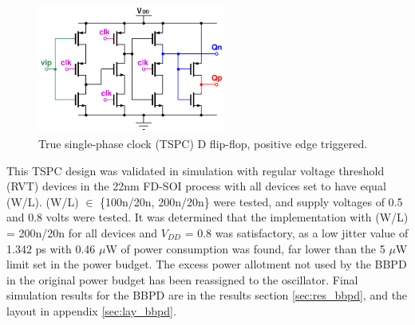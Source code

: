 			\begin{figure}[htb!]
			        \centering
			        \includegraphics[width=0.55\textwidth, angle=0]{./figs/design/tspc_}
			    \caption{True single-phase clock (TSPC) D flip-flop, positive edge triggered.}
			    \label{fig:tspc_dff}
			\end{figure}

		This TSPC design was validated in simulation with regular voltage threshold (RVT) devices in the 22nm FD-SOI process with all devices set to have equal (W/L). (W/L) $\in$ \{100n/20n, 200n/20n\} were tested, and supply voltages of 0.5 and 0.8 volts were tested. It was determined that the implementation with (W/L) = 200n/20n for all devices and $V_{DD}$ = 0.8 was satisfactory, as a low jitter value of 1.342 ps with 0.46 $\mu$W of power consumption was found, far lower than the 5 $\mu$W limit set in the power budget. The excess power allotment not used by the BBPD in the original power budget has been reassigned to the oscillator. Final simulation results for the BBPD are in the results section \ref{sec:res_bbpd}, and the layout in appendix \ref{sec:lay_bbpd}.




